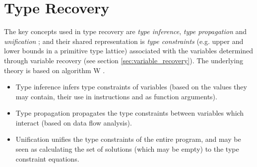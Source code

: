 
\section{Type Recovery}




The key concepts used in type recovery are \textit{type inference}, \textit{type propagation} and \textit{unification} \cite{mycroft_type_based_decompilation}; and their shared representation is \textit{type constraints} (e.g. upper and lower bounds in a primitive type lattice) associated with the variables determined through variable recovery (see section \ref{sec:variable_recovery}). The underlying theory is based on algorithm W \cite{milner_algorithmw}.

\begin{itemize}
	\item Type inference infers type constraints of variables (based on the values they may contain, their use in instructions and as function arguments).
	\item Type propagation propagates the type constraints between variables which interact (based on data flow analysis).
	\item Unification unifies the type constraints of the entire program, and may be seen as calculating the set of solutions (which may be empty) to the type constraint equations.
\end{itemize}




%
%

%
